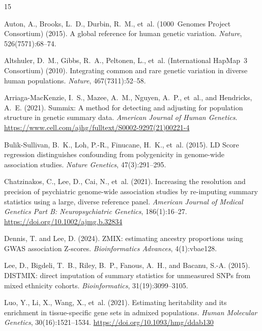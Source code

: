 \documentclass[11pt,a4paper]{article}
\begin{document}
\begin{thebibliography}{15}
\providecommand{\natexlab}[1]{#1}

Auton, A., Brooks, L.~D., Durbin, R.~M., et~al. (1000~Genomes Project
Consortium) (2015).
A global reference for human genetic variation.
\emph{Nature}, 526(7571):68--74.

Altshuler, D.~M., Gibbs, R.~A., Peltonen, L., et~al. (International
HapMap~3 Consortium) (2010).
Integrating common and rare genetic variation in diverse human
populations.
\emph{Nature}, 467(7311):52--58.

Arriaga-MacKenzie, I.~S., Mazee, A.~M., Nguyen, A.~P., et~al., and
Hendricks, A.~E. (2021).
Summix: A method for detecting and adjusting for population structure in
genetic summary data.
\emph{American Journal of Human Genetics}.
\url{https://www.cell.com/ajhg/fulltext/S0002-9297(21)00221-4}

Bulik-Sullivan, B.~K., Loh, P.-R., Finucane, H.~K., et~al. (2015).
LD Score regression distinguishes confounding from polygenicity in
genome-wide association studies.
\emph{Nature Genetics}, 47(3):291--295.

Chatzinakos, C., Lee, D., Cai, N., et~al. (2021).
Increasing the resolution and precision of psychiatric genome-wide
association studies by re-imputing summary statistics using a large,
diverse reference panel.
\emph{American Journal of Medical Genetics Part B: Neuropsychiatric
Genetics}, 186(1):16--27.
\url{https://doi.org/10.1002/ajmg.b.32834}

Dennis, T. and Lee, D. (2024).
ZMIX: estimating ancestry proportions using GWAS association Z-scores.
\emph{Bioinformatics Advances}, 4(1):vbae128.

Lee, D., Bigdeli, T.~B., Riley, B.~P., Fanous, A.~H., and
Bacanu, S.-A. (2015).
DISTMIX: direct imputation of summary statistics for unmeasured SNPs from
mixed ethnicity cohorts.
\emph{Bioinformatics}, 31(19):3099--3105.

Luo, Y., Li, X., Wang, X., et~al. (2021).
Estimating heritability and its enrichment in tissue-specific gene sets in
admixed populations.
\emph{Human Molecular Genetics}, 30(16):1521--1534.
\url{https://doi.org/10.1093/hmg/ddab130}


\end{thebibliography}
\end{document}
